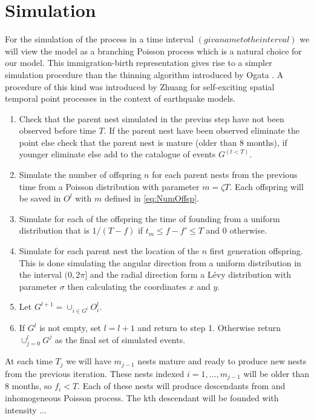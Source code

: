 \documentclass[11pt,a4paper]{article}
\begin{document}
{\color{red}\section{Simulation}

For the simulation of the process in a time interval $(givanametotheinterval)$ we will view the model as a branching Poisson process \cite{Lewis} which is a natural choice for our model. This immigration-birth representation gives rise to a simpler simulation procedure than the thinning algorithm introduced by Ogata \cite{Ogata}. A procedure of this kind was introduced by Zhuang \cite{Zhuang} for self-exciting spatial temporal point processes in the context of earthquake models.

\begin{enumerate}
    \item Check that the parent nest simulated in the previus step have not been observed before time $T$. If the parent nest have been observed eliminate the point else check that the parent nest is mature (older than 8 months), if younger eliminate else add to the catalogue of events $G^{(t<T)}$.
    \item Simulate the number of offspring $n$ for each parent nests from the previous time from a Poisson distribution with parameter $ m = \zeta T$. Each offspring will be saved in $O^l$ with $m$  defined in \ref{eq:NumOffsp}.
    \item Simulate for each of the offspring the time of founding from a uniform distribution that is $1/(T-f)$ if $t_m \leq f - f' \leq T $ and $0$ otherwise.
    \item Simulate for each parent nest the location of the $n$ first generation offspring. This is done simulating the angular direction from a uniform distribution in the interval $(0, 2\pi]$ and the radial direction form a L\'evy distribution with parameter $\sigma$ then calculating the coordinates $x$ and $y$.
    \item Let $G^{l+1} = \cup_{i\in G^l} O_i^l$.
    \item If $G^l$ is not empty, set $l = l+1$ and return to step 1. Otherwise return $\cup_{j=0}^l G^j$ as the final set of simulated events.
\end{enumerate}

At each time $T_j$ we will have $m_{j-1}$ nests mature and ready to produce new nests from the previous iteration. These nests indexed $i = 1, \dots, m_{j-1}$ will be older than 8 months, so $f_i < T$. Each of these nests will produce descendants from and inhomogeneous Poisson process. The kth descendant will be founded with intensity ...

}
\end{document}
